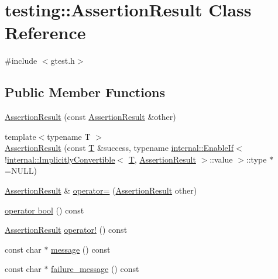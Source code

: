 \hypertarget{classtesting_1_1_assertion_result}{}\section{testing\+:\+:Assertion\+Result Class Reference}
\label{classtesting_1_1_assertion_result}


{\ttfamily \#include $<$gtest.\+h$>$}

\subsection*{Public Member Functions}
\begin{DoxyCompactItemize}
\item 
\hyperlink{classtesting_1_1_assertion_result_a27788116f03f90aec4daf592fd809ead}{Assertion\+Result} (const \hyperlink{classtesting_1_1_assertion_result}{Assertion\+Result} \&other)
\item 
{\footnotesize template$<$typename T $>$ }\\\hyperlink{classtesting_1_1_assertion_result_a9b8d1d6d0a979d0769ed4ff97d06c4e3}{Assertion\+Result} (const \hyperlink{functions__7_8js_adf1f3edb9115acb0a1e04209b7a9937b}{T} \&success, typename \hyperlink{structtesting_1_1internal_1_1_enable_if}{internal\+::\+Enable\+If}$<$ !\hyperlink{classtesting_1_1internal_1_1_implicitly_convertible}{internal\+::\+Implicitly\+Convertible}$<$ \hyperlink{functions__7_8js_adf1f3edb9115acb0a1e04209b7a9937b}{T}, \hyperlink{classtesting_1_1_assertion_result}{Assertion\+Result} $>$\+::value $>$\+::type $\ast$=N\+U\+LL)
\item 
\hyperlink{classtesting_1_1_assertion_result}{Assertion\+Result} \& \hyperlink{classtesting_1_1_assertion_result_aad9274c7b69eda67eb9306963a790839}{operator=} (\hyperlink{classtesting_1_1_assertion_result}{Assertion\+Result} other)
\item 
\hyperlink{classtesting_1_1_assertion_result_af85b7852e6399467cd74df539810abcd}{operator bool} () const 
\item 
\hyperlink{classtesting_1_1_assertion_result}{Assertion\+Result} \hyperlink{classtesting_1_1_assertion_result_a85301ba52aa1efe89b79d1e3b59160cd}{operator!} () const 
\item 
const char $\ast$ \hyperlink{classtesting_1_1_assertion_result_ab20c91eba13e20f1b4ad89e3d15f69a8}{message} () const 
\item 
const char $\ast$ \hyperlink{classtesting_1_1_assertion_result_ae54fa82506c507a9dbc0f85d2cec652a}{failure\+\_\+message} () const 

\end{DoxyCompactItemize}
